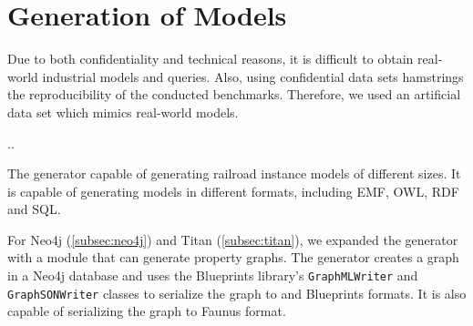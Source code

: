 \section{Generation of Models}

Due to both confidentiality and technical reasons, it is difficult to obtain real-world industrial models and queries. Also, using confidential data sets hamstrings the reproducibility of the conducted benchmarks. Therefore, we used an artificial data set which mimics real-world models.

..

The generator capable of generating railroad instance models of different sizes. It is capable of generating models in different formats, including EMF, OWL, RDF and SQL. 

For Neo4j (\autoref{subsec:neo4j}) and Titan (\autoref{subsec:titan}), we expanded the generator with a module that can generate property graphs. The generator creates a graph in a Neo4j database and uses the Blueprints library's \texttt{GraphMLWriter} and \texttt{GraphSONWriter} classes to serialize the graph to \graphml{} and Blueprints \graphson{} formats. It is also capable of serializing the graph to Faunus \graphson{} format.


